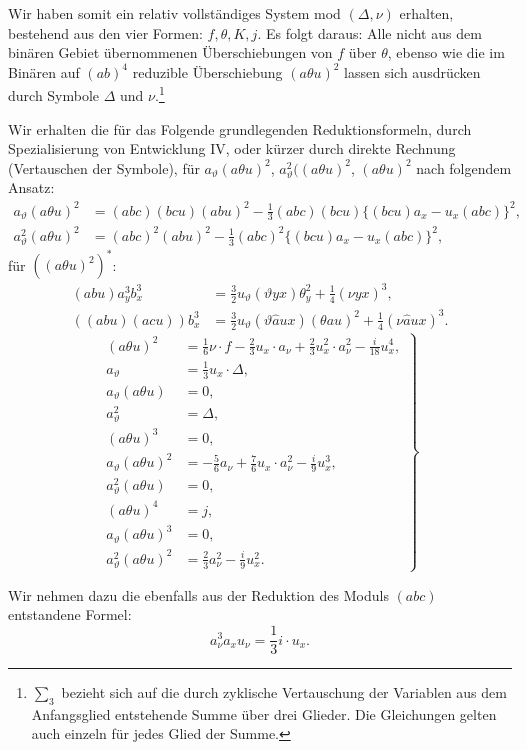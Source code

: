 \documentclass[11pt]{article}
\newcommand{\A}{\Delta}
\begin{document}
Wir haben somit ein relativ vollständiges System mod $(\A,\nu)$ erhalten, bestehend aus den vier Formen: $f,\theta,K,j$. Es folgt daraus: Alle nicht aus dem binären Gebiet übernommenen Überschiebungen von $f$ über $\theta$, ebenso wie die im Binären auf $(ab)^4$ reduzible Überschiebung $(a\theta u)^2$ lassen sich ausdrücken durch Symbole $\A$ und $\nu$.\footnote{$\sum_3$ bezieht sich auf die durch zyklische Vertauschung der Variablen aus dem Anfangsglied entstehende Summe über drei Glieder. Die Gleichungen gelten auch einzeln für jedes Glied der Summe.}

Wir erhalten die für das Folgende grundlegenden Reduktionsformeln, durch Spezialisierung von Entwicklung IV, oder kürzer durch direkte Rechnung (Vertauschen der Symbole), für $a_\vartheta(a\theta u)^2$, $a_\vartheta^2((a\theta u)^2$, $(a\theta u)^2$ nach folgendem Ansatz:
\[
\begin{aligned}
a_\vartheta(a\theta u)^2
&=(abc)(bcu)(abu)^2-\frac13(abc)(bcu)\{(bcu)a_x-u_x(abc)\}^2,\\
a_\vartheta^2(a\theta u)^2
&=(abc)^2(abu)^2-\frac13(abc)^2\{(bcu)a_x-u_x(abc)\}^2,
\end{aligned}
\]
für $((a\theta u)^2)^{*}$:
\[
\begin{aligned}
(abu)a_y^3b_x^3&=\frac32u_\vartheta(\vartheta yx)\theta_y^2+\frac14(\nu yx)^3,\\
((abu)(acu))b_x^3&=\frac32u_\vartheta(\vartheta\widehat{a}ux)(\theta au)^2+\frac14(\nu\widehat{a}ux)^3.
\end{aligned}
\]
\[
\left.
\begin{aligned}
(a\theta u)^2&=\frac16\nu\cdot f-\frac23u_x\cdot a_\nu
+\frac23u_x^2\cdot a_\nu^2-\frac{i}{18}u_x^4,\\
a_\vartheta&=\frac13u_x\cdot\A,\\
a_\vartheta(a\theta u)&=0,\\
a_\vartheta^2&=\A,\\
(a\theta u)^3&=0,\\
a_\vartheta(a\theta u)^2&=-\frac56a_\nu+\frac76u_x\cdot a_\nu^2-\frac{i}{9}u_x^3,\\
a_\vartheta^2(a\theta u)&=0,\\
(a\theta u)^4&=j,\\
a_\vartheta(a\theta u)^3&=0,\\
a_\vartheta^2(a\theta u)^2&=\frac23a_\nu^2-\frac{i}{9}u_x^2.
\end{aligned}
\right\} \tag{1}
\]

Wir nehmen dazu die ebenfalls aus der Reduktion des Moduls $(abc)$ entstandene Formel:
\[
a_\nu^3a_xu_\nu=\frac13 i\cdot u_x. \tag{2}
\]
\end{document}
